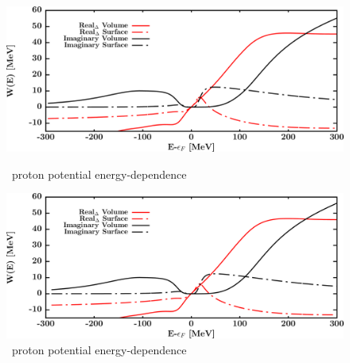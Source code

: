 \begin{figure}[H]
    \centering
    \begin{minipage}{0.45\textwidth}
        \centering
        \includegraphics[width=1.0\textwidth]{figures/ca40_protonPotentials.png}
        \caption{\caForty\ proton potential energy-dependence}
        \label{DOMFitData_ca40_proton_potentialComponent_energy}
    \end{minipage}\hfill
    \begin{minipage}{0.45\textwidth}
        \centering
        \includegraphics[width=1.0\textwidth]{figures/ca40_neutronPotentials.png}
        \caption{\caForty\ proton potential energy-dependence}
        \label{DOMFitData_ca40_neutron_potentialComponent_energy}
    \end{minipage}
\end{figure}

